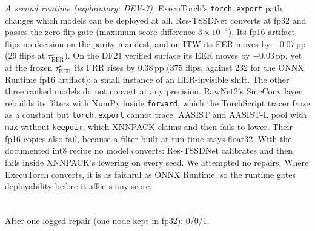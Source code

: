 \documentclass[journal]{IEEEtran}
\newcommand{\frr}{\mathrm{FRR}}
\newcommand{\eer}{\mathrm{EER}}
\newcommand{\taustar}{\tau^{\star}}
\begin{document}
\emph{A second runtime (exploratory; DEV-7).} ExecuTorch's \texttt{torch.export}
path changes which models can be deployed at all. Res-TSSDNet converts at fp32
and passes the zero-flip gate (maximum score difference \(3{\times}10^{-4}\)).
Its fp16 artifact flips no decision on the parity manifest, and on ITW its EER
moves by \(-0.07\)\,pp (29 flips at \(\taustar_{\eer}\)).
On the DF21 verified surface its EER moves by \(-0.03\)\,pp, yet at the frozen
\(\taustar_{\eer}\) its FRR rises by 0.38\,pp (375 flips, against 232 for the
ONNX Runtime fp16 artifact): a small instance of an EER-invisible shift.
The other three ranked models do not convert at any precision. RawNet2's SincConv
layer rebuilds its filters with NumPy inside \texttt{forward}, which the
TorchScript tracer froze as a constant but \texttt{torch.export} cannot trace.
AASIST and AASIST-L pool with \texttt{max} without \texttt{keepdim}, which
XNNPACK claims and then fails to lower. Their fp16 copies also fail, because a
filter built at run time stays float32. With the documented int8 recipe no
model converts: Res-TSSDNet calibrates and then fails inside XNNPACK's lowering
on every seed. We attempted no repairs. Where ExecuTorch converts, it is as
faithful as ONNX Runtime, so the runtime gates deployability before it
affects any score.

\begin{table}[!t]
\caption{Conversion outcomes. fp32: decision flips at
\(\taustar_{\eer}/\taustar_{\frr1}/\taustar_{\frr5}\) against PyTorch on the
1,000-clip parity manifest. int8: registered PTQ search (minmax, at most 12
attempts, D39); \(K\) = layers kept in fp32; budget = +1.0\,pp diagnostic EER.}
\label{tab:res-conv}
\centering
{}
\\[2pt]{\footnotesize \textsuperscript{\dag}After one logged repair (one node kept in fp32): 0/0/1.}
\end{table}
\end{document}
